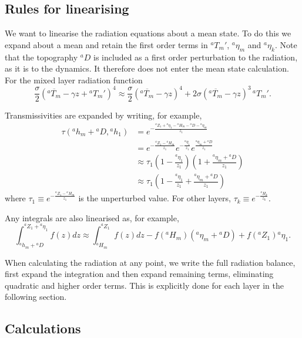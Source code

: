 \documentclass[11pt, a4paper,twoside]{article}
\newcommand{\etb}[2]{{{}^{#1}\eta_{#2}}}
\newcommand{\HH}[2]{{{}^{#1}H_{#2}}}
\newcommand{\Z}[2]{{{}^{#1}Z_{#2}}}
\newcommand{\h}[2]{{{}^{#1}h_{#2}}}
\newcommand{\T}[2]{{{}^{#1}T_{#2}}}
\newcommand{\D}[1]{{}^{#1}D}
\numberwithin{equation}{section}
\begin{document}
\subsection{Rules for linearising}
We want to linearise the radiation equations about a mean state.
To do this we expand about a mean and retain the first order terms in $\T{a}{m}'$, $\etb{a}{m}$ and $\etb{a}{k}$.
Note that the topography $\D{a}$ is included as a first order perturbation to the radiation, as it is to the dynamics.
It therefore does not enter the mean state calculation.
For the mixed layer radiation function
\begin{equation}
\frac{\sigma}{2}(\overline{\T{a}{m}} - \gamma z + \T{a}{m}')^4 \approx \frac{\sigma}{2}(\overline{\T{a}{m}} - \gamma z)^4 + 2\sigma(\overline{\T{a}{m}} - \gamma z)^3 \, \T{a}{m}'.
\end{equation}

Transmissivities are expanded by writing, for example,
\begin{equation}
\begin{split}
\tau(\h{a}{m}+\D{a},\h{a}{1}) &= e^{-\frac{\Z{a}{1} + \etb{a}{1} -\HH{a}{m} -\D{a} - \etb{a}{m}}{z_1}} \\
&= e^{-\frac{\Z{a}{1} -\HH{a}{m}}{z_1}} e^{-\frac{\etb{a}{1}}{z_1}}e^{\frac{\etb{a}{m}+\D{a}}{z_1}}\\
&\approx \tau_1\left(1 -  \frac{\etb{a}{1}}{z_1} \right)\left(1 + \frac{\etb{a}{m}+\D{a}}{z_1} \right)\\
&\approx \tau_1\left(1 -  \frac{\etb{a}{1}}{z_1}  + \frac{\etb{a}{m}+\D{a}}{z_1} \right)
\end{split}
\end{equation}
where $\tau_1 \equiv e^{-\frac{\Z{a}{1}-\HH{a}{m} }{z_1}}$ is the unperturbed value.
For other layers, $\tau_k \equiv e^{-\frac{\HH{a}{k}}{z_k}}$.

Any integrals are also linearised as, for example,
\begin{equation}
\int_{\h{a}{m} + \D{a} }^{\Z{a}{1} + \etb{a}{1}}f(z)dz \approx \int_{\HH{a}{m} }^{\Z{a}{1}}f(z)dz - f(\HH{a}{m}) (\etb{a}{m}+\D{a}) + f(\Z{a}{1}) \etb{a}{1}.
\end{equation}

When calculating the radiation at any point, we write the full radiation balance, first expand the integration and then expand remaining terms, eliminating quadratic and higher order terms.
This is explicitly done for each layer in the following section.

\subsection{Calculations}
\end{document}
